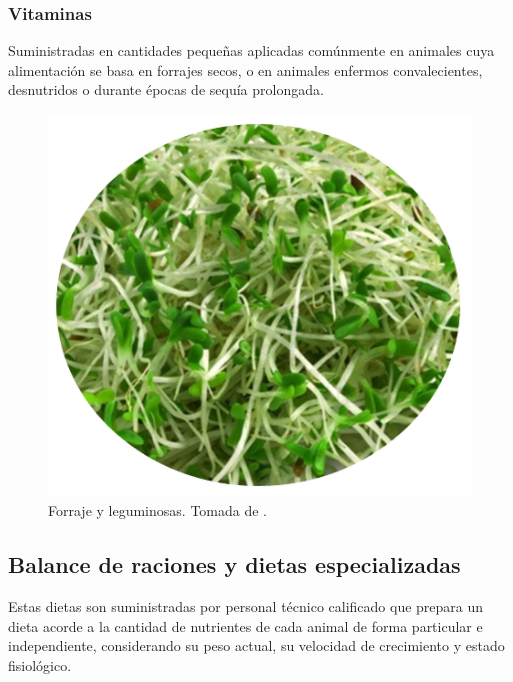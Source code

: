 \subsubsection{Vitaminas}
Suministradas en cantidades pequeñas aplicadas comúnmente en animales cuya alimentación se basa en forrajes secos,  o en animales enfermos convalecientes, desnutridos o durante épocas de sequía prolongada.
	\begin{figure}[H]
	 \begin{center}
	 \includegraphics[scale=0.6]{img/leguminosas.png}
	 \end{center}
	 \caption{Forraje y leguminosas. Tomada de \cite{librito1}. \label{vitaminaspng}}
	\end{figure}

\subsection{Balance de raciones y dietas especializadas}
    Estas dietas son suministradas por personal técnico calificado que prepara un dieta acorde a la cantidad de nutrientes de cada animal de forma particular e independiente, considerando su peso actual, su velocidad de crecimiento y estado fisiológico.


